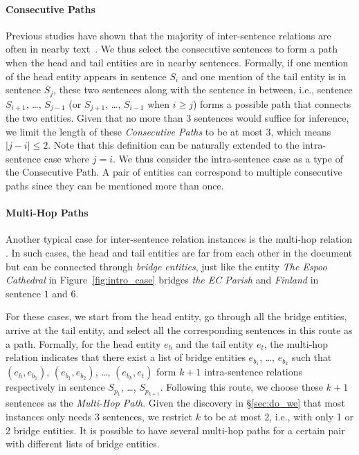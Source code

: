 \documentclass[11pt,a4paper]{article}
\begin{document}
\paragraph{Consecutive Paths}
Previous studies have shown that the majority of inter-sentence relations are often in nearby text~\cite{swampillai2010inter,quirk-poon-2017-distant}.
We thus select the consecutive sentences to form a path when the head and tail entities are in nearby sentences. Formally, if 
one mention of the head entity appears in sentence $S_i$ and one mention of the tail entity is in sentence $S_j$, these two sentences along with the sentence in between, i.e., sentence $S_{i+1}$, …, $S_{j-1}$ (or $S_{j+1}$, …, $S_{i-1}$ when $i \geq j$) forms a possible path that connects the two entities. 
Given that no more than 3 sentences would suffice for inference, we limit the length of these \textit{Consecutive Paths} to be at most 3, which means $|j-i| \leq 2$.
Note that this definition can be naturally extended to the intra-sentence case where $j=i$. We thus consider the intra-sentence case as a type of the Consecutive Path.
A pair of entities can correspond to multiple consecutive paths since they can be mentioned more than once.

\paragraph{Multi-Hop Paths}
Another typical case for inter-sentence relation instances is the multi-hop relation \cite{yao_docred_2019,zeng-etal-2020-double}. In such cases, the head and tail entities are far from each other in the document but can be connected through \textit{bridge entities}, just like the entity \textit{The Espoo Cathedral} in Figure~\ref{fig:intro_case} bridges \textit{the EC Parish} and \textit{Finland} in sentence $1$ and $6$.

For these cases, we start from the head entity, go through all the bridge entities, arrive at the tail entity, and select all the corresponding sentences in this route as a path. Formally, for the head entity $e_h$ and the tail entity $e_t$, the multi-hop relation indicates that there exist a list of bridge entities $e_{b_1}$, …, $e_{b_k}$ such that $(e_h, e_{b_1})$, $(e_{b_1}, e_{b_2})$, …, $(e_{b_k}, e_t)$ form $k+1$ intra-sentence relations respectively in sentence $S_{p_1}$, …, $S_{p_{k+1}}$. Following this route, we choose these $k+1$ sentences as the \textit{Multi-Hop Path}. Given the discovery in \S\ref{sec:do_we} that most instances only needs 3 sentences, we restrict $k$ to be at most 2, i.e., with only 1 or 2 bridge entities. 
It is possible to have several multi-hop paths for a certain pair with different lists of bridge entities.
\end{document}
